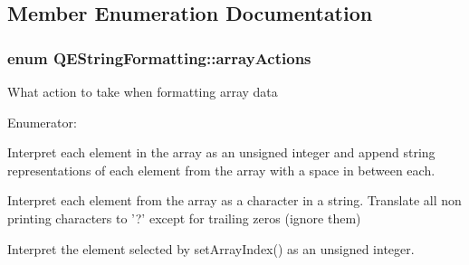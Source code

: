 \subsection{Member Enumeration Documentation}
\hypertarget{classQEStringFormatting_a36b424886bc64cea8f7ed69b2b03c0b9}{
\subsubsection[{arrayActions}]{\setlength{\rightskip}{0pt plus 5cm}enum {\bf QEStringFormatting::arrayActions}}}
\label{classQEStringFormatting_a36b424886bc64cea8f7ed69b2b03c0b9}
What action to take when formatting array data \begin{Desc}
\item[Enumerator: ]\par
\begin{description}
\item[{\em 
\hypertarget{classQEStringFormatting_a36b424886bc64cea8f7ed69b2b03c0b9a17613cfb7e87103922490471cd6bde06}{
APPEND}
\label{classQEStringFormatting_a36b424886bc64cea8f7ed69b2b03c0b9a17613cfb7e87103922490471cd6bde06}
}]Interpret each element in the array as an unsigned integer and append string representations of each element from the array with a space in between each. \item[{\em 
\hypertarget{classQEStringFormatting_a36b424886bc64cea8f7ed69b2b03c0b9ae8a32203c042705835af1cd34c85c0d2}{
ASCII}
\label{classQEStringFormatting_a36b424886bc64cea8f7ed69b2b03c0b9ae8a32203c042705835af1cd34c85c0d2}
}]Interpret each element from the array as a character in a string. Translate all non printing characters to '?' except for trailing zeros (ignore them) \item[{\em 
\hypertarget{classQEStringFormatting_a36b424886bc64cea8f7ed69b2b03c0b9a83330940881ccb325ea24056232b6e68}{
INDEX}
\label{classQEStringFormatting_a36b424886bc64cea8f7ed69b2b03c0b9a83330940881ccb325ea24056232b6e68}
}]Interpret the element selected by setArrayIndex() as an unsigned integer. \end{description}
\end{Desc}

